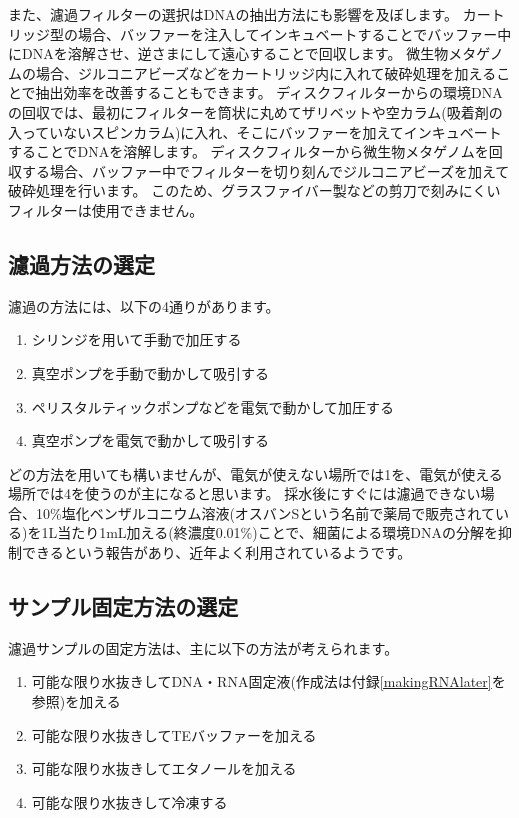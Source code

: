 \documentclass[titlepage,10pt,a4paper,uplatex]{jsbook}
\begin{document}
また、濾過フィルターの選択はDNAの抽出方法にも影響を及ぼします。
カートリッジ型の場合、バッファーを注入してインキュベートすることでバッファー中にDNAを溶解させ、逆さまにして遠心することで回収します\citep{Miya2016}。
微生物メタゲノムの場合、ジルコニアビーズなどをカートリッジ内に入れて破砕処理を加えることで抽出効率を改善することもできます\citep{Ushio2019}。
ディスクフィルターからの環境DNAの回収では、最初にフィルターを筒状に丸めてザリベットや空カラム(吸着剤の入っていないスピンカラム)に入れ、そこにバッファーを加えてインキュベートすることでDNAを溶解します。
ディスクフィルターから微生物メタゲノムを回収する場合、バッファー中でフィルターを切り刻んでジルコニアビーズを加えて破砕処理を行います。
このため、グラスファイバー製などの剪刀で刻みにくいフィルターは使用できません。

\subsection{濾過方法の選定}

濾過の方法には、以下の4通りがあります。

\begin{enumerate}
\item シリンジを用いて手動で加圧する
\item 真空ポンプを手動で動かして吸引する
\item ペリスタルティックポンプなどを電気で動かして加圧する
\item 真空ポンプを電気で動かして吸引する
\end{enumerate}

どの方法を用いても構いませんが、電気が使えない場所では1を、電気が使える場所では4を使うのが主になると思います。
採水後にすぐには濾過できない場合、10\%塩化ベンザルコニウム溶液(オスバンSという名前で薬局で販売されている)を1L当たり1mL加える(終濃度0.01\%)ことで、細菌による環境DNAの分解を抑制できるという報告\citep{Yamanaka2017}があり、近年よく利用されているようです。

\subsection{サンプル固定方法の選定}

濾過サンプルの固定方法は、主に以下の方法が考えられます。

\begin{enumerate}
\item 可能な限り水抜きしてDNA・RNA固定液(作成法は付録\ref{makingRNAlater}を参照)を加える
\item 可能な限り水抜きしてTEバッファーを加える
\item 可能な限り水抜きしてエタノールを加える
\item 可能な限り水抜きして冷凍する
\end{enumerate}
\end{document}
